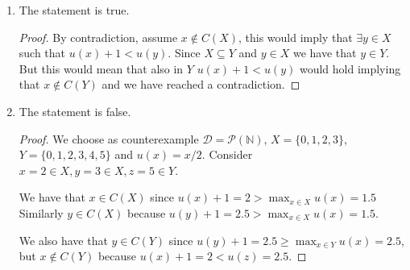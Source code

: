 \documentclass[12pt]{extarticle}
\numberwithin{table}{section}
\numberwithin{figure}{section}
\newcommand{\N}{\mathbb{N}}
\numberwithin{equation}{section}
\begin{document}
\begin{enumerate}[label=\alph*.)]
    \item The statement is true.
          \begin{proof}
              By contradiction, assume $x \notin C(X)$, this would imply that $\exists y \in X$ such that $u(x) + 1 < u(y)$.
              Since $X \subseteq Y$ and $y \in X$ we have that $y \in Y$.
              But this would mean that also in $Y$ $u(x) + 1 < u(y)$ would hold implying that $x \notin C(Y)$ and we have reached a contradiction.
          \end{proof}
    \item The statement is false.
          \begin{proof}
              We choose as counterexample $\mathcal D = \mathcal P(\N)$, $X = \{0,1,2,3\}$, $Y = \{0,1,2,3, 4, 5\}$ and $u(x) = x/2$.
              Consider $x = 2 \in X, y = 3 \in X, z = 5 \in Y$.

              We have that $x \in C(X)$ since $u(x) + 1 = 2 > \max_{x \in X} u(x) = 1.5$
              Similarly $y \in C(X)$ because $u(y) + 1 = 2.5 > \max_{x \in X} u(x) = 1.5$.

              We also have that $y \in C(Y)$ since $u(y) + 1 = 2.5 \geq \max_{x \in Y} u(x) = 2.5$, but $x \notin C(Y)$ because $u(x) + 1 = 2 < u(z) = 2.5$.
          \end{proof}
\end{enumerate}
\end{document}
